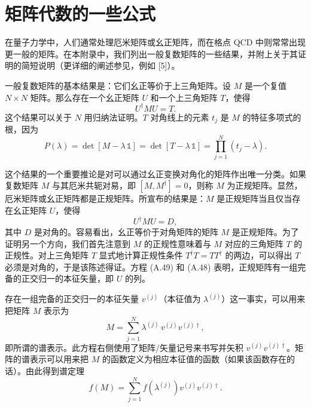 \section{矩阵代数的一些公式}

在量子力学中，人们通常处理厄米矩阵或幺正矩阵，而在格点 QCD 中则常常出现更一般的矩阵。在本附录中，我们列出一般复数矩阵的一些结果，并附上关于其证明的简短说明（更详细的阐述参见，例如 [5]）。

一般复数矩阵的基本结果是：它们幺正等价于上三角矩阵。设 $M$ 是一个复值 $N\times N$ 矩阵。那么存在一个幺正矩阵 $U$ 和一个上三角矩阵 $T$，使得
\begin{equation}
  U^\dagger M U = T .
\end{equation}
这个结果可以关于 $N$ 用归纳法证明。$T$ 对角线上的元素 $t_j$ 是 $M$ 的特征多项式的根，因为
\begin{equation}
  P(\lambda) = \det[M - \lambda\,\mathbb{1}] = \det[T - \lambda\,\mathbb{1}]
  = \prod_{j=1}^{N}(t_j - \lambda).
\end{equation}

这个结果的一个重要推论是对可以通过幺正变换对角化的矩阵作出唯一分类。如果复数矩阵 $M$ 与其厄米共轭对易，即 $[M, M^\dagger] = 0$，则称 $M$ 为正规矩阵。显然，厄米矩阵或幺正矩阵都是正规矩阵。所宣布的结果是：$M$ 是正规矩阵当且仅当存在幺正矩阵 $U$，使得
\begin{equation}
  U^\dagger M U = D ,
\end{equation}
其中 $D$ 是对角的。容易看出，幺正等价于对角矩阵的矩阵 $M$ 是正规矩阵。为了证明另一个方向，我们首先注意到 $M$ 的正规性意味着与 $M$ 对应的三角矩阵 $T$ 的正规性。对上三角矩阵 $T$ 显式地计算正规性条件 $T^\dagger T = T T^\dagger$ 的两边，可以得出 $T$ 必须是对角的，于是该陈述得证。方程 (A.49) 和 (A.48) 表明，正规矩阵有一组完备的正交归一的本征矢量，即 $U$ 的列。

存在一组完备的正交归一的本征矢量 $v^{(j)}$（本征值为 $\lambda^{(j)}$）这一事实，可以用来把矩阵 $M$ 表示为
\begin{equation}
  M = \sum_{j=1}^{N}\lambda^{(j)}\,v^{(j)}v^{(j)\dagger},
\end{equation}
即所谓的谱表示。此方程右侧使用了矩阵/矢量记号来书写并矢积 $v^{(j)}v^{(j)\dagger}$。矩阵的谱表示可以用来把 $M$ 的函数定义为相应本征值的函数（如果该函数存在的话）。由此得到谱定理
\begin{equation}
  f(M) = \sum_{j=1}^{N}f\!\left(\lambda^{(j)}\right) v^{(j)}v^{(j)\dagger}.
\end{equation}

